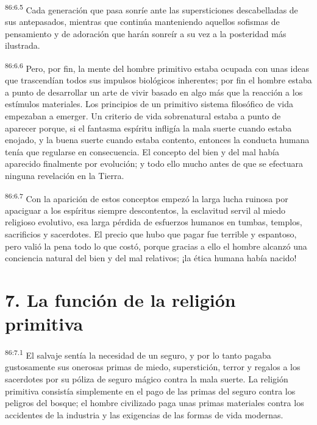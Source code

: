 \par
\textsuperscript{86:6.5} Cada generación que pasa sonríe ante las supersticiones descabelladas de sus antepasados, mientras que continúa manteniendo aquellos sofismas de pensamiento y de adoración que harán sonreír a su vez a la posteridad más ilustrada.

\par
\textsuperscript{86:6.6} Pero, por fin, la mente del hombre primitivo estaba ocupada con unas ideas que trascendían todos sus impulsos biológicos inherentes; por fin el hombre estaba a punto de desarrollar un arte de vivir basado en algo más que la reacción a los estímulos materiales. Los principios de un primitivo sistema filosófico de vida empezaban a emerger. Un criterio de vida sobrenatural estaba a punto de aparecer porque, si el fantasma espíritu infligía la mala suerte cuando estaba enojado, y la buena suerte cuando estaba contento, entonces la conducta humana tenía que regularse en consecuencia. El concepto del bien y del mal había aparecido finalmente por evolución; y todo ello mucho antes de que se efectuara ninguna revelación en la Tierra.

\par
\textsuperscript{86:6.7} Con la aparición de estos conceptos empezó la larga lucha ruinosa por apaciguar a los espíritus siempre descontentos, la esclavitud servil al miedo religioso evolutivo, esa larga pérdida de esfuerzos humanos en tumbas, templos, sacrificios y sacerdotes. El precio que hubo que pagar fue terrible y espantoso, pero valió la pena todo lo que costó, porque gracias a ello el hombre alcanzó una conciencia natural del bien y del mal relativos; ¡la ética humana había nacido!

\section*{7. La función de la religión primitiva}
\par
\textsuperscript{86:7.1} El salvaje sentía la necesidad de un seguro, y por lo tanto pagaba gustosamente sus onerosas primas de miedo, superstición, terror y regalos a los sacerdotes por su póliza de seguro mágico contra la mala suerte. La religión primitiva consistía simplemente en el pago de las primas del seguro contra los peligros del bosque; el hombre civilizado paga unas primas materiales contra los accidentes de la industria y las exigencias de las formas de vida modernas.

